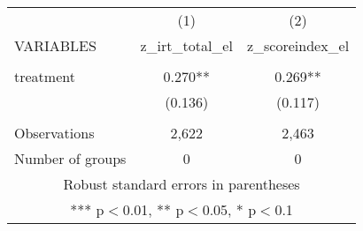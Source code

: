 \documentclass[]{article}
\begin{document}
\begin{tabular}{lcc} \hline
 & (1) & (2) \\
VARIABLES & z\_irt\_total\_el & z\_scoreindex\_el \\ \hline
 &  &  \\
treatment & 0.270** & 0.269** \\
 & (0.136) & (0.117) \\
 &  &  \\
Observations & 2,622 & 2,463 \\
 Number of groups & 0 & 0 \\ \hline
\multicolumn{3}{c}{ Robust standard errors in parentheses} \\
\multicolumn{3}{c}{ *** p$<$0.01, ** p$<$0.05, * p$<$0.1} \\
\end{tabular}
\end{document}
